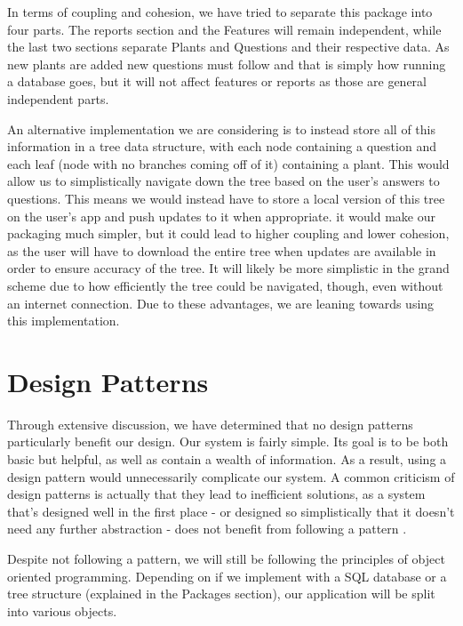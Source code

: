 \documentclass[a4paper]{article}
\begin{document}
In terms of coupling and cohesion, we have tried to separate this package into four parts. The reports section and the Features will remain independent, while the last two sections separate Plants and Questions and their respective data. As new plants are added new questions must follow and that is simply how running a database goes, but it will not affect features or reports as those are general independent parts.

An alternative implementation we are considering is to instead store all of this information in a tree data structure, with each node containing a question and each leaf (node with no branches coming off of it) containing a plant. This would allow us to simplistically navigate down the tree based on the user's answers to questions. This means we would instead have to store a local version of this tree on the user's app and push updates to it when appropriate. it would make our packaging much simpler, but it could lead to higher coupling and lower cohesion, as the user will have to download the entire tree when updates are available in order to ensure accuracy of the tree. It will likely be more simplistic in the grand scheme due to how efficiently the tree could be navigated, though, even without an internet connection. Due to these advantages, we are leaning towards using this implementation.

\pagebreak

\section{Design Patterns}

Through extensive discussion, we have determined that no design patterns particularly benefit our design. Our system is fairly simple. Its goal is to be both basic but helpful, as well as contain a wealth of information. As a result, using a design pattern would unnecessarily complicate our system. A common criticism of design patterns is actually that they lead to inefficient solutions, as a system that's designed well in the first place - or designed so simplistically that it doesn't need any further abstraction - does not benefit from following a pattern \cite{patterns}. 

Despite not following a pattern, we will still be following the principles of object oriented programming. Depending on if we implement with a SQL database or a tree structure (explained in the Packages section), our application will be split into various objects. 
\end{document}
